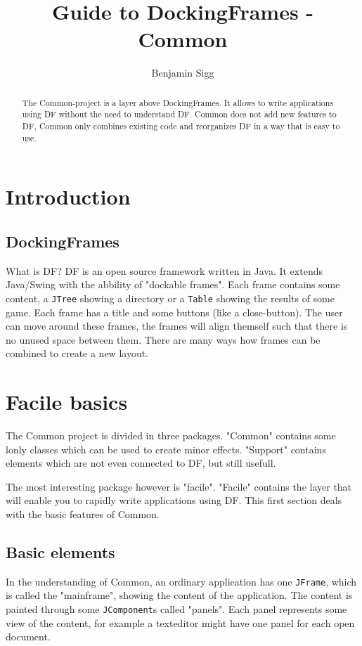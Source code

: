\documentclass[a4paper,10pt]{article}
\title{Guide to DockingFrames - Common}
\author{Benjamin Sigg}
\newcommand{\src}[1]{\lstinline[basicstyle=\ttfamily]|#1|}
\begin{document}
\maketitle

\begin{abstract}
The Common-project is a layer above DockingFrames. It allows to write applications using DF without the need to understand DF. Common does not add new features to DF, Common only combines existing code and reorganizes DF in a way that is easy to use.
\end{abstract}

\section{Introduction}
\subsection{DockingFrames}
What is DF? DF is an open source framework written in Java. It extends Java/Swing with the abbility of "dockable frames". Each frame contains some content, a \src{JTree} showing a directory or a \src{Table} showing the results of some game. Each frame has a title and some buttons (like a close-button). The user can move around these frames, the frames will align themself such that there is no unused space between them. There are many ways how frames can be combined to create a new layout.

\section{Facile basics}
The Common project is divided in three packages. "Common" contains some lonly classes which can be used to create minor effects. "Support" contains elements which are not even connected to DF, but still usefull.

The most interesting package however is "facile". "Facile" contains the layer that will enable you to rapidly write applications using DF. This first section deals with the basic features of Common.

\subsection{Basic elements}
In the understanding of Common, an ordinary application has one \src{JFrame}, which is called the "mainframe", showing the content of the application. The content is painted through some \src{JComponent}s called "panels". Each panel represents some view of the content, for example a texteditor might have one panel for each open document.
\end{document}
